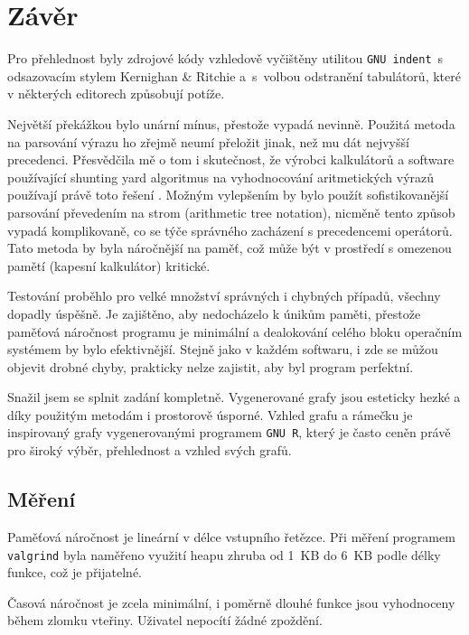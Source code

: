 \documentclass[11pt]{article}
\begin{document}
\section{Závěr}
Pro přehlednost byly zdrojové kódy vzhledově vyčištěny utilitou \texttt{GNU indent}~s
odsazovacím stylem Kernighan \& Ritchie a~s~volbou odstranění tabulátorů, které
v některých editorech způsobují potíže.

Největší překážkou bylo unární mínus, přestože vypadá nevinně. Použitá metoda
na parsování výrazu ho zřejmě neumí přeložit jinak, než mu dát nejvyšší
precedenci. Přesvědčila mě o tom i skutečnost, že výrobci kalkulátorů a
software používající shunting yard algoritmus na vyhodnocování aritmetických
výrazů používají právě toto řešení \cite{minus}. Možným vylepšením by bylo
použít sofistikovanější parsování převedením na strom (arithmetic tree
notation), nicměně tento způsob vypadá komplikovaně, co se týče správného
zacházení s precedencemi operátorů. Tato metoda by byla náročnější na paměť,
což může být v prostředí s omezenou pamětí (kapesní kalkulátor) kritické.

Testování proběhlo pro velké množství správných i chybných případů, všechny
dopadly úspěšně. Je zajištěno, aby nedocházelo k únikům paměti, přestože
paměťová náročnost programu je minimální a dealokování celého bloku operačním
systémem by bylo efektivnější.  Stejně jako v každém softwaru, i zde se můžou
objevit drobné chyby, prakticky nelze zajistit, aby byl program perfektní.

Snažil jsem se splnit zadání kompletně. Vygenerované grafy
jsou esteticky hezké a díky použitým metodám i prostorově úsporné. Vzhled grafu
a rámečku je inspirovaný grafy vygenerovanými programem \texttt{GNU R}, který je často
ceněn právě pro široký výběr, přehlednost a vzhled svých grafů. 

\subsection{Měření}
Paměťová náročnost je lineární v délce vstupního řetězce. Při měření programem
\texttt{valgrind} byla naměřeno využití heapu zhruba od 1~KB do 6~KB podle délky
funkce, což je přijatelné.

Časová náročnost je zcela minimální, i poměrně dlouhé funkce jsou vyhodnoceny
během zlomku vteřiny. Uživatel nepocítí žádné zpoždění.
\end{document}
